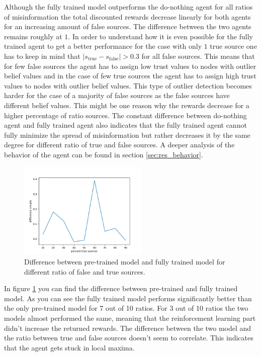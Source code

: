 \documentclass[11pt, a4paper]{article}
\begin{document}
Although the fully trained model outperforms the do-nothing agent for all ratios of misinformation the total discounted rewards decrease linearly for both agents for an increasing amount of false sources. The difference between the two agents remains roughly at $1$. In order to understand how it is even possible for the fully trained agent to get a better performance for the case with only $1$ true source one has to keep in mind that $|s_\text{true}-s_\text{false}| > 0.3$ for all false sources. This means that for few false sources the agent has to assign low trust values to nodes with outlier belief values and in the case of few true sources the agent has to assign high trust values to nodes with outlier belief values. This type of outlier detection becomes harder for the case of a majority of false sources as the false sources have different belief values. This might be one reason why the rewards decrease for a higher percentage of ratio sources. The constant difference between do-nothing agent and fully trained agent also indicates that the fully trained agent cannot fully minimize the spread of misinformation but rather decreases it by the same degree for different ratio of true and false sources. A deeper analysis of the behavior of the agent can be found in section \ref{sec:res_behavior}. \newline

\begin{figure}[h]
	\centering
	\includegraphics[width=0.55\textwidth]{dif_cm-pto.png}
	\caption{\label{fig:dif_cm-pto} Difference between pre-trained model and fully trained model for different ratio of false and true sources.}
\end{figure}

In figure \ref{fig:dif_cm-pto} you can find the difference between pre-trained and fully trained model. As you can see the fully trained model performs significantly better than the only pre-trained model for 7 out of 10 ratios. For 3 out of 10 ratios the two models almost performed the same, meaning that the reinforcement learning part didn't increase the returned rewards. The difference between the two model and the ratio between true and false sources doesn't seem to correlate. This indicates that the agent gets stuck in local maxima.
\end{document}
